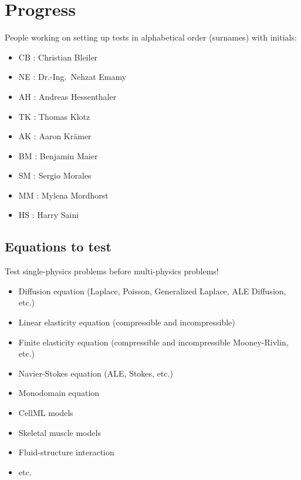 %
\clearpage
%
\section{Progress}
%
People working on setting up tests in alphabetical order (surnames) with initials:
%
\begin{itemize}
    \item CB : Christian Bleiler
    \item  NE : Dr.-Ing.\ Nehzat Emamy
    \item  AH : Andreas Hessenthaler
    \item  TK : Thomas Klotz
    \item  AK : Aaron Kr\"amer
    \item  BM : Benjamin Maier
    \item  SM : Sergio Morales
    \item  MM : Mylena Mordhorst
    \item  HS : Harry Saini
\end{itemize}
%
\subsection{Equations to test}
%
Test single-physics problems before multi-physics problems!
%
\begin{itemize}
    \item Diffusion equation (Laplace, Poisson, Generalized Laplace, ALE Diffusion, etc.)
    \item Linear elasticity equation (compressible and incompressible)
    \item Finite elasticity equation (compressible and incompressible Mooney-Rivlin, etc.)
    \item Navier-Stokes equation (ALE, Stokes, etc.)
    \item Monodomain equation
    \item CellML models
    \item Skeletal muscle models
    \item Fluid-structure interaction
    \item etc.
\end{itemize}
%
